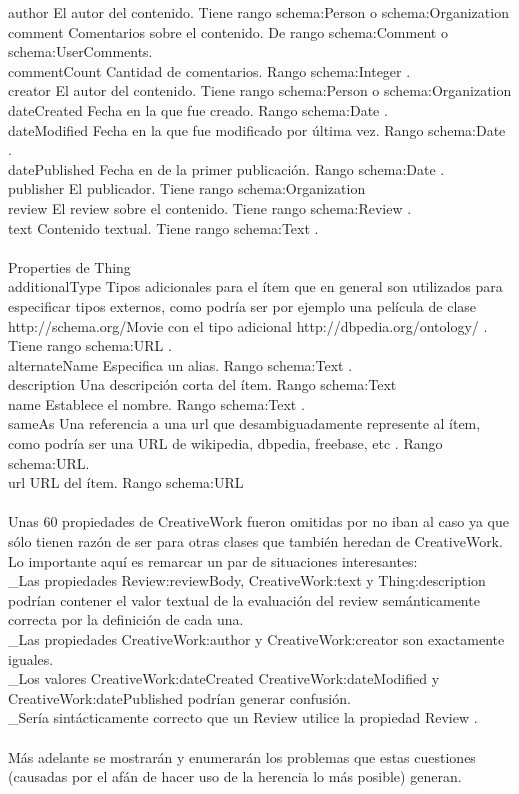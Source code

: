 author 	El autor del contenido. Tiene rango schema:Person o schema:Organization\\
comment 	Comentarios sobre el contenido. De rango schema:Comment o schema:UserComments.\\
commentCount 	Cantidad de comentarios. Rango schema:Integer . \\
creator 	El autor del contenido. Tiene rango schema:Person o schema:Organization\\
dateCreated 	Fecha en la que fue creado. Rango schema:Date .\\
dateModified 	Fecha en la que fue modificado por última vez. Rango schema:Date .\\
datePublished 	Fecha en de la primer publicación. Rango schema:Date .\\
publisher 	El publicador. Tiene rango schema:Organization\\
review 	 	El review sobre el contenido. Tiene rango schema:Review .\\
text 		Contenido textual. Tiene rango schema:Text .\\
\\Properties de Thing\\
additionalType 	 Tipos adicionales para el ítem que en general son utilizados para especificar tipos externos, como podría ser por ejemplo una película de clase http://schema.org/Movie con el tipo adicional  http://dbpedia.org/ontology/ . Tiene rango schema:URL .\\
alternateName 	 Especifica un alias. Rango schema:Text .\\
description 	Una descripción corta del ítem. Rango schema:Text \\
name 		Establece el nombre. Rango schema:Text .\\
sameAs 		Una referencia a una url que desambiguadamente represente al ítem, como podría ser una URL de wikipedia, dbpedia, freebase, etc . Rango schema:URL.\\
url 		URL del ítem. Rango schema:URL\\
\\
Unas 60 propiedades de CreativeWork fueron omitidas por no iban al caso ya que sólo tienen razón de ser para otras clases que 
también heredan de CreativeWork. Lo importante aquí es remarcar un par de situaciones interesantes:\\
_Las propiedades Review:reviewBody, CreativeWork:text y Thing:description podrían contener el valor textual de la evaluación del review semánticamente correcta por la definición de cada una.\\
_Las propiedades CreativeWork:author y CreativeWork:creator son exactamente iguales. \\
_Los valores CreativeWork:dateCreated CreativeWork:dateModified y CreativeWork:datePublished podrían generar confusión. \\
_Sería sintácticamente correcto que un Review utilice la propiedad Review .\\
\\
Más adelante se mostrarán y enumerarán los problemas que estas cuestiones (causadas por el afán de hacer uso de la herencia
lo más posible)  generan. \\